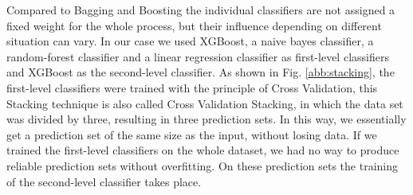 \newpage
Compared to Bagging and Boosting the individual classifiers are not assigned a fixed weight for the whole process, but their influence depending on different situation can vary. 
In our case we used XGBoost, a naive bayes classifier, a random-forest classifier and a linear regression classifier as first-level classifiers and XGBoost as the second-level classifier. As shown in Fig. \ref{abb:stacking}, the first-level classifiers were trained with the principle of Cross Validation, this Stacking technique is also called Cross Validation Stacking, in which the data set was divided by three, resulting in three prediction sets. In this way, we essentially get a prediction set of the same size as the input, without losing data. If we trained the first-level classifiers on the whole dataset, we had no way to produce reliable prediction sets without overfitting. On these prediction sets the training of the second-level classifier takes place. 
